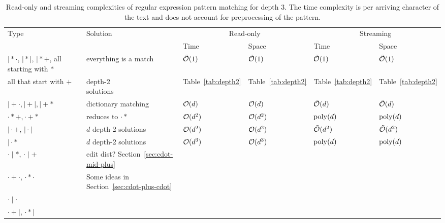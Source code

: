 \documentclass{article}
\begin{document}
\begin{table}[H]
    \centering
    \begin{tabularx}{\textwidth}{|l|X|X|X|X|X|}
   		\hline
        \multirow{2}{*}{Type} & \multirow{2}{*}{Solution} & \multicolumn{2}{c|}{Read-only} & \multicolumn{2}{c|}{Streaming} 
         \\ \cline{3-6}
		 &  & Time & Space & Time & Space\\ \hline \hline
		 
        $\mid * \cdot$, $\mid * \mid$, $\mid * +$, all starting with $*$  & everything is a match & $\tilde{\mathcal{O}}(1)$ & $\tilde{\mathcal{O}}(1)$ & $\tilde{\mathcal{O}}(1)$ & $\tilde{\mathcal{O}}(1)$ \\ \hline

        all that start with $+$ & \makecell{depth-2 \\ solutions} &  Table~\ref{tab:depth2} &  Table~\ref{tab:depth2} &  Table~\ref{tab:depth2} &  Table~\ref{tab:depth2} \\ \hline
        
$\mid + \cdot, \mid + \mid, \mid + *$ & dictionary matching & $\mathcal{O}(d)$ & $\mathcal{O}(d)$ & $\tilde{\mathcal{O}}(d)$ & $\tilde{\mathcal{O}}(d)$ \\ \hline  

$\cdot * +, \cdot + *$ & reduces to $\cdot *$ & $\mathcal{O}(d^2)$ & $\mathcal{O}(d^2)$ & $\mathrm{poly}(d)$ & $\mathrm{poly}(d)$ \\ \hline

$\mid \cdot +$, $\mid \cdot \mid$  & $d$ depth-2 solutions & $\mathcal{O}(d^2)$ & $\mathcal{O}(d^2)$ & $\tilde{\mathcal{O}}(d^2)$ & $\tilde{\mathcal{O}}(d^2)$ \\ \hline 

$\mid \cdot *$  & $d$ depth-2 solutions & 	$\mathcal{O}(d^3)$ & $\mathcal{O}(d^3)$ & $\mathrm{poly}(d)$ & $\mathrm{poly}(d)$ \\ \hline 
  
  $\cdot \mid * $, $\cdot \mid + $  & edit dist? Section~\ref{sec:cdot-mid-plus} &  &  &  & \\ \hline 
  
  $\cdot + \cdot$, $\cdot * \cdot$  &  Some ideas in Section~\ref{sec:cdot-plus-cdot} &  &  &  & \\ \hline

  $\cdot \mid \cdot $  &  &  &  & &  \\ \hline  
   
  $\cdot + \mid$, $\cdot * \mid$  & &  &  &  & \\ \hline
\end{tabularx}
    
\caption{Read-only and streaming complexities of regular expression pattern matching for depth 3. The time complexity is per arriving character of the text and does not account for preprocessing of the pattern.}
\end{table}
\end{document}
